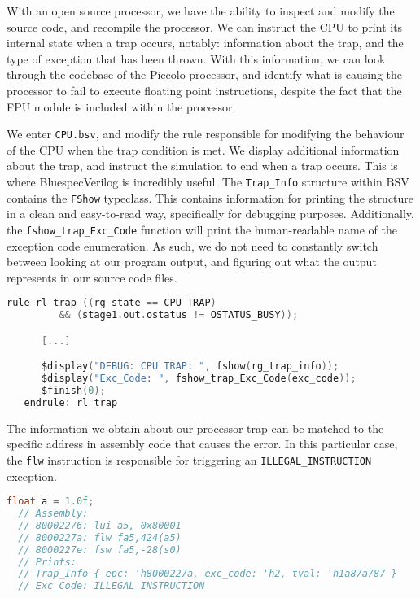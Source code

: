 \documentclass[a4paper,9pt]{report}
\begin{document}
With an open source processor, we have the ability to inspect and modify the
source code, and recompile the processor. We can instruct the CPU to print its
internal state when a trap occurs, notably: information about the trap, and the
type of exception that has been thrown. With this information, we can look
through the codebase of the Piccolo processor, and identify what is causing the
processor to fail to execute floating point instructions, despite the fact that
the FPU module is included within the processor.

We enter \texttt{CPU.bsv}, and modify the rule responsible for modifying the
behaviour of the CPU when the trap condition is met. We display additional
information about the trap, and instruct the simulation to end when a trap
occurs. This is where BluespecVerilog is incredibly useful. The
\texttt{Trap\_Info} structure within BSV contains the \texttt{FShow} typeclass.
This contains information for printing the structure in a clean and easy-to-read
way, specifically for debugging purposes. Additionally, the
\texttt{fshow\_trap\_Exc\_Code} function will print the human-readable name of
the exception code enumeration. As such, we do not need to constantly switch
between looking at our program output, and figuring out what the output
represents in our source code files.
\begin{lstlisting}[language=C,style=customc]
   rule rl_trap ((rg_state == CPU_TRAP)
		 && (stage1.out.ostatus != OSTATUS_BUSY));

      [...]

      $display("DEBUG: CPU TRAP: ", fshow(rg_trap_info));
      $display("Exc_Code: ", fshow_trap_Exc_Code(exc_code));
      $finish(0);
   endrule: rl_trap
\end{lstlisting}

The information we obtain about our processor trap can be matched to the
specific address in assembly code that causes the error. In this particular
case, the \texttt{flw} instruction is responsible for triggering an
\texttt{ILLEGAL\_INSTRUCTION} exception.
\begin{lstlisting}[language=C,style=customc]
  float a = 1.0f;
  // Assembly:
  // 80002276: lui a5, 0x80001
  // 8000227a: flw fa5,424(a5)
  // 8000227e: fsw fa5,-28(s0)
  // Prints:
  // Trap_Info { epc: 'h8000227a, exc_code: 'h2, tval: 'h1a87a787 }
  // Exc_Code: ILLEGAL_INSTRUCTION
\end{lstlisting}
\end{document}
